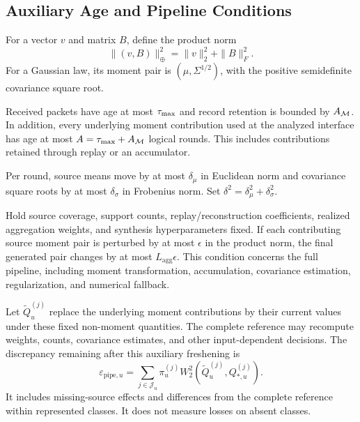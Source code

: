 \subsection{Auxiliary Age and Pipeline Conditions}

For a vector $v$ and matrix $B$, define the product norm
\begin{equation}
 \|(v,B)\|_\oplus^2=\|v\|_2^2+\|B\|_F^2.
\end{equation}
For a Gaussian law, its moment pair is $(\mu,\Sigma^{1/2})$, with the positive semidefinite covariance square root.

\begin{assumption}
\label{asm:supp_staleness}
Received packets have age at most $\tau_{\max}$ and record retention is bounded by $A_{\mathcal{M}}$. In addition, every underlying moment contribution used at the analyzed interface has age at most $A=\tau_{\max}+A_{\mathcal{M}}$ logical rounds. This includes contributions retained through replay or an accumulator.

Per round, source means move by at most $\delta_\mu$ in Euclidean norm and covariance square roots by at most $\delta_\sigma$ in Frobenius norm. Set $\delta^2=\delta_\mu^2+\delta_\sigma^2$.

Hold source coverage, support counts, replay/reconstruction coefficients, realized aggregation weights, and synthesis hyperparameters fixed. If each contributing source moment pair is perturbed by at most $\epsilon$ in the product norm, the final generated pair changes by at most $L_{\mathrm{agg}}\epsilon$. This condition concerns the full pipeline, including moment transformation, accumulation, covariance estimation, regularization, and numerical fallback.
\end{assumption}

Let $\widetilde Q_u^{(j)}$ replace the underlying moment contributions by their current values under these fixed non-moment quantities. The complete reference may recompute weights, counts, covariance estimates, and other input-dependent decisions. The discrepancy remaining after this auxiliary freshening is
\begin{equation}
 \varepsilon_{\mathrm{pipe},u}
 =\sum_{j\in\mathcal J_u}\pi_u^{(j)}
 W_2^2(\widetilde Q_u^{(j)},Q_{*,u}^{(j)}).
\end{equation}
It includes missing-source effects and differences from the complete reference within represented classes. It does not measure losses on absent classes.


